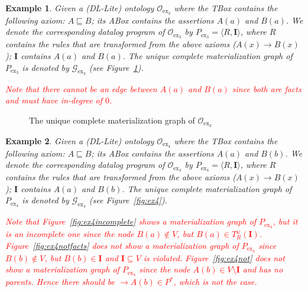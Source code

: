 \documentclass[final,1p,times]{elsarticle}
\newtheorem{example}{Example}
\begin{document}
\clearpage

\begin{example}\label{exp:dllite}
  Given a (DL-Lite) ontology $\mathcal{O}_{\text{ex}_3}$ where the
  TBox contains the following axiom: $A\sqsubseteq B$; its ABox
  contains the assertions $A(a)$ and $B(a)$.  We denote the
  corresponding datalog program of $\mathcal{O}_{\text{ex}_3}$ by
  $P_{\text{ex}_3}=\langle R, \textbf{I}\rangle$, where $R$ contains
  the rules that are transformed from the above axioms
  ($A(x) \to B(x)$); $\textbf{I}$ contains $A(a)$ and $B(a)$.  The
  unique complete materialization graph of $P_{\text{ex}_3}$ is
  denoted by $\mathcal{G}_{\text{ex}_3}$ (see Figure~\ref{fig:ex3}).

  \textcolor{red}{Note that there cannot be an edge between $A(a)$ and $B(a)$ since
  both are facts and must have in-degree of $0$.}
\end{example}

\begin{figure}[htbp]
\centering
{}
\caption{The unique complete materialization graph of $\mathcal{O}_{\text{ex}_3}$}
\label{fig:ex3}
\end{figure}

\clearpage

\begin{example}\label{exp:dllite}
  Given a (DL-Lite) ontology $\mathcal{O}_{\text{ex}_4}$ where the
  TBox contains the following axiom: $A\sqsubseteq B$; its ABox
  contains the assertions $A(a)$ and $B(b)$.  We denote the
  corresponding datalog program of $\mathcal{O}_{\text{ex}_4}$ by
  $P_{\text{ex}_4}=\langle R, \textbf{I}\rangle$, where $R$ contains
  the rules that are transformed from the above axioms
  ($A(x) \to B(x)$); $\textbf{I}$ contains $A(a)$ and $B(b)$.  The
  unique complete materialization graph of $P_{\text{ex}_4}$ is
  denoted by $\mathcal{G}_{\text{ex}_4}$ (see Figure~\ref{fig:ex4}).

  \textcolor{red}{Note that Figure~\ref{fig:ex4incomplete} shows a
    materialization graph of $P_{\text{ex}_4}$, but it is an
    incomplete one since the node $B(a) \not\in V$, but
    $B(a) \in T_R^{\omega}(\textbf{I})$. Figure~\ref{fig:ex4notfacts}
    does not show a materialization graph of $P_{\text{ex}_4}$ since
    $B(b) \not\in V$, but $B(b) \in \textbf{I}$ and
    $\textbf{I} \subseteq V$ is violated. Figure~\ref{fig:ex4not} does
    not show a materialization graph of $P_{\text{ex}_4}$ since the
    node $A(b) \in V \setminus \textbf{I}$ and has no parents. Hence
    there should be $\rightarrow A(b)\in P^*$, which is not the case.}
\end{example}
\end{document}
